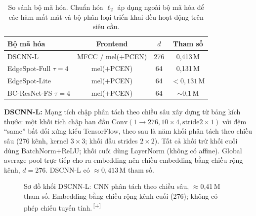 \documentclass[12pt,a4paper]{report}
\newcommand{\NEW}[1]{{\color{addcolor}#1\,\textsuperscript{\tiny[+]}}}
\newcommand{\NEW}[1]{#1}
\begin{document}
\begin{table}[H]
\centering
\caption{So sánh bộ mã hóa. Chuẩn hóa $\ell_2$ áp dụng ngoài bộ mã hóa để các
hàm mất mát và bộ phân loại triển khai đều hoạt động trên siêu cầu.}
\label{tab:encoders}
\begin{tabular}{lccc}
\toprule
\textbf{Bộ mã hóa} & \textbf{Frontend} & \textbf{$d$} & \textbf{Tham số} \\
\midrule
DSCNN-L              & MFCC / mel($+$PCEN) & 276 & 0{,}413\,M \\
EdgeSpot-Full $\tau{=}4$ & mel($+$PCEN)    & 64  & 0{,}131\,M \\
EdgeSpot-Lite       & mel($+$PCEN)        & 64  & $<0{,}131$\,M \\
BC-ResNet-FS $\tau{=}4$  & mel($+$PCEN)    & 64  & $\sim$0{,}1\,M \\
\bottomrule
\end{tabular}
\end{table}

\textbf{DSCNN-L:} Mạng tích chập phân tách theo chiều sâu xây dựng từ bảng kích
thước: một khối tích chập ban đầu $\text{Conv}(1{\to}276, 10{\times}4, \text{stride
}2{\times}1)$ với đệm ``same'' bất đối xứng kiểu TensorFlow, theo sau là năm khối
phân tách theo chiều sâu (276 kênh, kernel $3{\times}3$; khối đầu strides
$2{\times}2$). Tất cả khối trừ khối cuối dùng BatchNorm+ReLU; khối cuối dùng
LayerNorm (không có affine). Global average pool trực tiếp cho ra embedding nên
chiều embedding bằng chiều rộng kênh, $d = 276$. DSCNN-L có $\approx 0{,}413$\,M
tham số.

\begin{figure}[H]
\centering
{}
\caption{\NEW{Sơ đồ khối DSCNN-L: CNN phân tách theo chiều sâu, $\approx$0{,}41\,M
tham số. Embedding bằng chiều rộng kênh cuối (276); không có phép chiếu tuyến
tính.}}
\label{fig:dscnn}
\end{figure}
\end{document}

